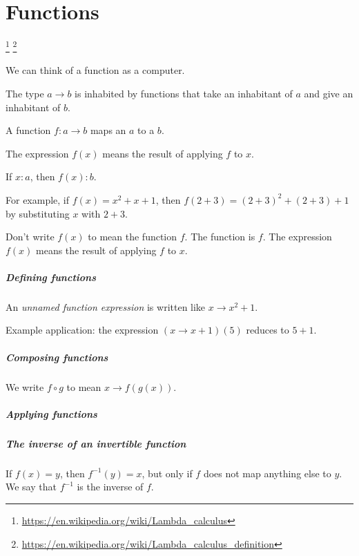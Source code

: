\chapter{Functions}

\footnote{\url{https://en.wikipedia.org/wiki/Lambda_calculus}}%
\footnote{\url{https://en.wikipedia.org/wiki/Lambda_calculus_definition}}

%
We can think of a function as a computer.

The type \( a \to b \) is inhabited by functions that take an inhabitant of \(a\) and give an inhabitant of \(b\).

A function \(f : a \to b\) maps an \(a\) to a \(b\).

The expression \(f(x)\) means the result of applying \(f\) to \(x\).

If \(x : a\), then \( f(x) : b \).

For example, if \(f(x) = x^2 + x + 1\), then \(f(2+3) = (2+3)^2 + (2+3) + 1\) by substituting \(x\) with \(2+3\).

Don't write \(f(x)\) to mean the function \(f\).
The function is \(f\).
The expression \(f(x)\) means the result of applying \(f\) to \(x\).

\paragraph{Defining functions}

An \emph{unnamed function expression} is written like \( x \to x^2 + 1 \).

Example application: the expression \( (x \to x + 1)(5) \) reduces to \( 5 + 1 \).

\paragraph{Composing functions}

We write \(f \circ g\) to mean \( x \to f(g(x)) \).

\paragraph{Applying functions}

\paragraph{The inverse of an invertible function}

If \(f(x) = y\), then \(f^{-1}(y) = x\),
but only if \(f\) does not map anything else to \(y\).
We say that \(f^{-1}\) is the inverse of \(f\).

